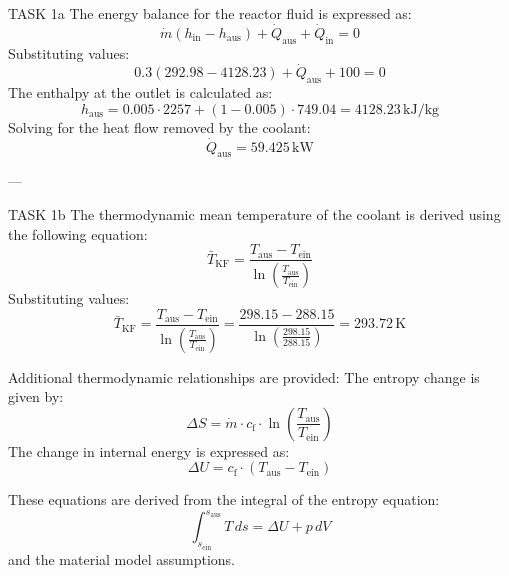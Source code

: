 TASK 1a  
The energy balance for the reactor fluid is expressed as:  
\[
\dot{m} \left( h_{\text{in}} - h_{\text{aus}} \right) + \dot{Q}_{\text{aus}} + \dot{Q}_{\text{in}} = 0
\]  
Substituting values:  
\[
0.3 \left( 292.98 - 4128.23 \right) + \dot{Q}_{\text{aus}} + 100 = 0
\]  
The enthalpy at the outlet is calculated as:  
\[
h_{\text{aus}} = 0.005 \cdot 2257 + (1 - 0.005) \cdot 749.04 = 4128.23 \, \text{kJ/kg}
\]  
Solving for the heat flow removed by the coolant:  
\[
\dot{Q}_{\text{aus}} = 59.425 \, \text{kW}
\]  

---

TASK 1b  
The thermodynamic mean temperature of the coolant is derived using the following equation:  
\[
\bar{T}_{\text{KF}} = \frac{T_{\text{aus}} - T_{\text{ein}}}{\ln \left( \frac{T_{\text{aus}}}{T_{\text{ein}}} \right)}
\]  
Substituting values:  
\[
\bar{T}_{\text{KF}} = \frac{T_{\text{aus}} - T_{\text{ein}}}{\ln \left( \frac{T_{\text{aus}}}{T_{\text{ein}}} \right)} = \frac{298.15 - 288.15}{\ln \left( \frac{298.15}{288.15} \right)} = 293.72 \, \text{K}
\]  

Additional thermodynamic relationships are provided:  
The entropy change is given by:  
\[
\Delta S = \dot{m} \cdot c_{\text{f}} \cdot \ln \left( \frac{T_{\text{aus}}}{T_{\text{ein}}} \right)
\]  
The change in internal energy is expressed as:  
\[
\Delta U = c_{\text{f}} \cdot \left( T_{\text{aus}} - T_{\text{ein}} \right)
\]  

These equations are derived from the integral of the entropy equation:  
\[
\int_{s_{\text{ein}}}^{s_{\text{aus}}} T \, ds = \Delta U + p \, dV
\]  
and the material model assumptions.